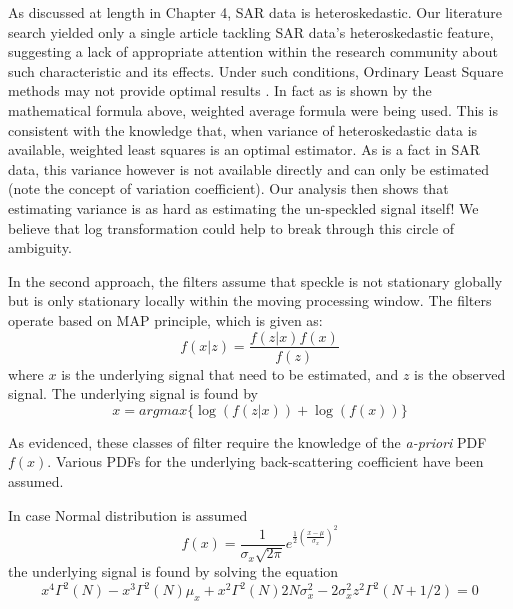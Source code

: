 As discussed at length in Chapter 4, SAR data is heteroskedastic.
Our literature search yielded only a single article \cite{Amirmazlaghani_2009_TIP} tackling SAR data's heteroskedastic feature, suggesting a lack of appropriate attention within the research community about such characteristic and its effects.
Under such conditions, Ordinary Least Square methods may not provide optimal results \cite{Woods_PAMI_1984}. 
In fact as is shown by the mathematical formula above, weighted average formula were being used.
This is consistent with the knowledge that, when variance of heteroskedastic data is available, weighted least squares is an optimal estimator.
As is a fact in SAR data, this variance however is not available directly and can only be estimated (note the concept of variation coefficient).
Our analysis then shows that estimating variance is as hard as estimating the un-speckled signal itself!
We believe that log transformation could help to break through this circle of ambiguity.

In the second approach, the filters assume that speckle is not stationary globally but is only stationary locally within the moving processing window.
The filters operate based on MAP principle, which is given as:
\begin{equation}
f(x|z) = \frac{f(z|x) f(x)}{f(z)}
\end{equation}
where
	$x$ is the underlying signal that need to be estimated, and
	$z$ is the observed signal.
The underlying signal is found by
\begin{equation}
x = argmax \{ \log(f(z|x)) + \log(f(x))  \} 
\end{equation}

As evidenced, these classes of filter require the knowledge of the \textit{a-priori} PDF $f(x)$. 
Various PDFs for the underlying back-scattering coefficient have been assumed. 

In case Normal distribution is assumed \cite{Medeiros_1998_IAI}
\begin{equation}
f(x) = \frac{1}{\sigma_x \sqrt{2 \pi} } e^{\frac{1}{2} \left( \frac{x-\mu}{\sigma_x} \right)^2 }
\end{equation}
the underlying signal is found by solving the equation
\begin{equation}
x^4 \Gamma^2(N) - x^3 \Gamma^2(N) \mu_x + x^2 \Gamma^2(N) 2N \sigma^2_x - 2 \sigma^2_x z^2 \Gamma^2(N+1/2) = 0
\end{equation}

